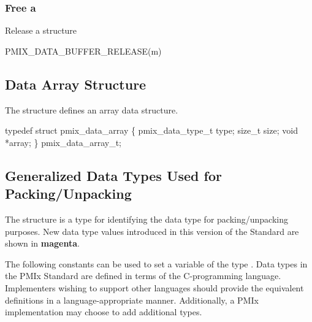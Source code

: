 \subsubsection{Free a }

Release a  structure

\cspecificstart
\begin{codepar}
PMIX_DATA_BUFFER_RELEASE(m)
\end{codepar}
\cspecificend

\begin{arglist}
\end{arglist}


\subsection{Data Array Structure}

The  structure defines an array data structure.

\cspecificstart
\begin{codepar}
typedef struct pmix_data_array \{
    pmix_data_type_t type;
    size_t size;
    void *array;
\} pmix_data_array_t;
\end{codepar}
\cspecificend



\subsection{Generalized Data Types Used for Packing/Unpacking}

The  structure is a  type for identifying the data type for packing/unpacking purposes. New data type values introduced in this version of the Standard are shown in \textbf{\color{magenta}magenta}.

\adviceimplstart
The following constants can be used to set a variable of the type . Data types in the \ac{PMIx} Standard are defined in terms of the C-programming language. Implementers wishing to support other languages should provide the equivalent definitions in a language-appropriate manner. Additionally, a PMIx implementation may choose to add additional types.
\adviceimplend

